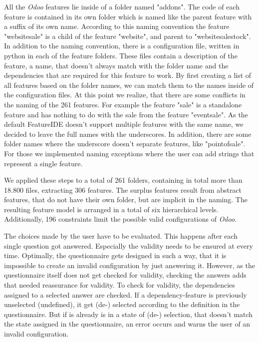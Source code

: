All the \textit{Odoo} features lie inside of a folder named "addons". The code of each feature is contained in its own folder which is named like the parent feature with a suffix of its own name. According to this naming convention the feature "website\textunderscore sale" is a child of the feature "website", and parent to "website\textunderscore sale\textunderscore stock". In addition to the naming convention, there is a configuration file, written in python in each of the feature folders. These files contain a description of the feature, a name, that doesn't always match with the folder name and the dependencies that are required for this feature to work.
By first creating a list of all features based on the folder names, we can match them to the names inside of the configuration files. At this point we realize, that there are some conflicts in the naming of the 261 features. For example the feature "sale" is a standalone feature and has nothing to do with the sale from the feature "event\textunderscore sale". As the default FeatureIDE doesn't support multiple features with the same name, we decided to leave the full names with the underscores. In addition, there are some folder names where the underscore doesn't separate features, like "point\textunderscore of\textunderscore sale". For those we implemented naming exceptions where the user can add strings that represent a single feature.

We applied these steps to a total of 261 folders, containing in total more than 18.800 files, extracting 306 features. The surplus features result from abstract features, that do not have their own folder, but are implicit in the naming. The resulting feature model is arranged in a total of six hierarchical levels. Additionally, 196 constraints limit the possible valid configurations of \textit{Odoo}.

The choices made by the user have to be evaluated. This happens after each single question got answered. Especially the validity needs to be ensured at every time. Optimally, the questionnaire gets designed in such a way, that it is impossible to create an invalid configuration by just answering it. However, as the questionnaire itself does not get checked for validity, checking the answers adds that needed reassurance for validity. To check for validity, the dependencies assigned to a selected answer are checked. If a dependency-feature is previously unselected (undefined), it get (de-) selected according to the definition in the questionnaire. But if is already is in a state of (de-) selection, that doesn't match the state assigned in the questionnaire, an error occurs and warns the user of an invalid configuration.


